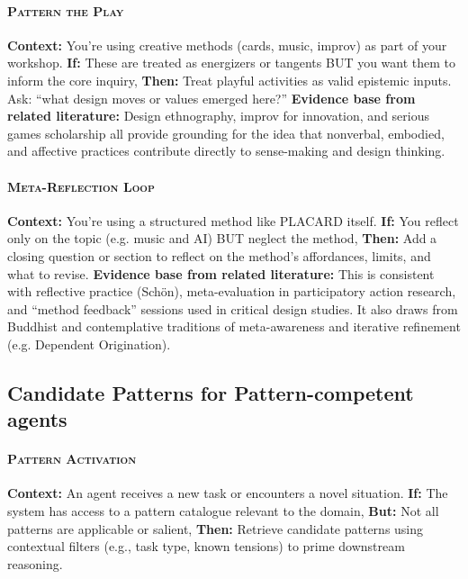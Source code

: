 \documentclass[acmlarge,timestamp]{acmart}
\begin{document}
{\paragraph*{{\scshape Pattern the Play}}

\noindent \textbf{Context:} You’re using creative methods (cards, music, improv) as part of your workshop.
\textbf{If:} These are treated as energizers or tangents BUT you want them to inform the core inquiry,
\textbf{Then:} Treat playful activities as valid epistemic inputs. Ask: “what design moves or values emerged here?”
\textbf{Evidence base from related literature:} Design ethnography, improv for innovation, and serious games scholarship all provide grounding for the idea that nonverbal, embodied, and affective practices contribute directly to sense-making and design thinking.

\paragraph*{{\scshape Meta-Reflection Loop}}

\noindent \textbf{Context:} You’re using a structured method like PLACARD itself.
\textbf{If:} You reflect only on the topic (e.g. music and AI) BUT neglect the method,
\textbf{Then:} Add a closing question or section to reflect on the method’s affordances, limits, and what to revise.
\textbf{Evidence base from related literature:} This is consistent with reflective practice (Schön), meta-evaluation in participatory action research, and “method feedback” sessions used in critical design studies. It also draws from Buddhist and contemplative traditions of meta-awareness and iterative refinement (e.g. Dependent Origination).

\subsection*{Candidate Patterns for Pattern-competent agents}

\paragraph*{{\scshape Pattern Activation}}

\noindent \textbf{Context:} An agent receives a new task or encounters a novel situation.
 \textbf{If:} The system has access to a pattern catalogue relevant to the domain,
 \textbf{But:} Not all patterns are applicable or salient,
 \textbf{Then:} Retrieve candidate patterns using contextual filters (e.g., task type, known tensions) to prime downstream reasoning.

}
\end{document}
